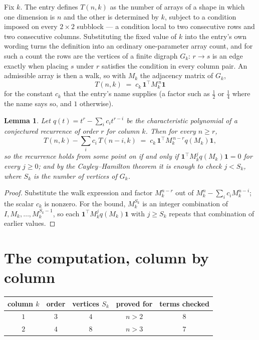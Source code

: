 \documentclass[11pt,a4paper]{article}
\theoremstyle{plain}
\newtheorem{lemma}[theorem]{Lemma}
\theoremstyle{definition}
\begin{document}
Fix $k$. The entry defines $T(n,k)$ as the number of arrays of a shape in which one dimension
is $n$ and the other is determined by $k$, subject to a condition imposed on every
$2\times2$ subblock --- a condition local to two consecutive rows and two consecutive columns.
Substituting the fixed value of $k$ into the entry's own wording turns the definition into an
ordinary one-parameter array count, and for such a count the rows are the vertices of a finite
digraph $G_k$: $r\to s$ is an edge exactly when placing $s$ under $r$ satisfies the condition
in every column pair. An admissible array is then a walk, so with $M_k$ the adjacency matrix
of $G_k$,
\[
T(n,k)\;=\;c_k\,\mathbf{1}^{\!\top}M_k^{\,n}\mathbf{1}
\]
for the constant $c_k$ that the entry's name supplies (a factor such as $\tfrac12$ or
$\tfrac14$ where the name says so, and $1$ otherwise).

\begin{lemma}\label{lem:crit}
Let $q(t)=t^{r}-\sum_i c_it^{r-i}$ be the characteristic polynomial of a conjectured
recurrence of order $r$ for column $k$. Then for every $n\ge r$,
\[
T(n,k)-\sum_i c_i\,T(n-i,k)\;=\;c_k\,\mathbf{1}^{\!\top}M_k^{\,n-r}q(M_k)\mathbf{1},
\]
so the recurrence holds from some point on if and only if
$\mathbf{1}^{\!\top}M_k^{j}q(M_k)\mathbf{1}=0$ for every $j\ge0$; and by the
Cayley--Hamilton theorem it is enough to check $j<S_k$, where $S_k$ is the number of vertices
of $G_k$.
\end{lemma}

\begin{proof}
Substitute the walk expression and factor $M_k^{n-r}$ out of $M_k^{n}-\sum_ic_iM_k^{n-i}$;
the scalar $c_k$ is nonzero. For the bound, $M_k^{S_k}$ is an integer combination of
$I,M_k,\dots,M_k^{S_k-1}$, so each $\mathbf{1}^{\!\top}M_k^{j}q(M_k)\mathbf{1}$ with
$j\ge S_k$ repeats that combination of earlier values.
\end{proof}

\section{The computation, column by column}

\begin{center}
\begin{tabular}{ccccc}
column $k$ & order & vertices $S_k$ & proved for & terms checked \\ \hline
$1$ & $3$ & $4$ & $n>2$ & $8$ \\
$2$ & $4$ & $8$ & $n>3$ & $7$ \\
\end{tabular}
\end{center}
\end{document}
